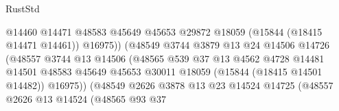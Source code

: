 \begin{lexlean}{RustStd}
\begin{coremodule}
                                              @14460
                                              @14471
                                              @48583
                                              @45649
                                              @45653
                                              @29872
                                              @18059
                                              (@15844 (@18415 @14471 @14461))
                                              @16975))
                                          (@48549
                                            @3744
                                            @3879
                                            @13
                                            @24
                                            @14506
                                            @14726
                                            (@48557
                                              @3744
                                              @13
                                              @14506
                                              (@48565
                                                @539
                                                @37
                                                @13
                                                @4562
                                                @4728
                                                @14481
                                                @14501
                                                @48583
                                                @45649
                                                @45653
                                                @30011
                                                @18059
                                                (@15844 (@18415 @14501 @14482))
                                                @16975))
                                            (@48549
                                              @2626
                                              @3878
                                              @13
                                              @23
                                              @14524
                                              @14725
                                              (@48557
                                                @2626
                                                @13
                                                @14524
                                                (@48565
                                                  @93
                                                  @37

\end{coremodule}
\end{lexlean}
